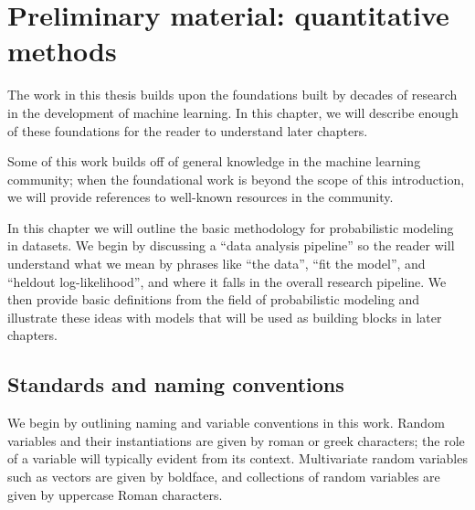 \chapter{Preliminary material: quantitative methods}
\label{chapter:introductory_material}

The work in this thesis builds upon the foundations built by decades
of research in the development of machine learning.  In this chapter,
we will describe enough of these foundations for the reader to
understand later chapters.

Some of this work builds off of general knowledge in the machine
learning community; when the foundational work is beyond the scope of
this introduction, we will provide references to well-known resources
in the community.

In this chapter we will outline the basic methodology for
probabilistic modeling in datasets.  We begin by discussing a ``data
analysis pipeline'' so the reader will understand what we mean by
phrases like ``the data'', ``fit the model'', and ``heldout
log-likelihood'', and where it falls in the overall research pipeline.
We then provide basic definitions from the field of probabilistic
modeling and illustrate these ideas with models that will be used as
building blocks in later chapters.

\section{Standards and naming conventions}
We begin by outlining naming and variable conventions in this work.
Random variables and their instantiations are given by roman or greek
characters; the role of a variable will typically evident from its
context.  Multivariate random variables such as vectors are given by
boldface, and collections of random variables are given by uppercase
Roman characters.

